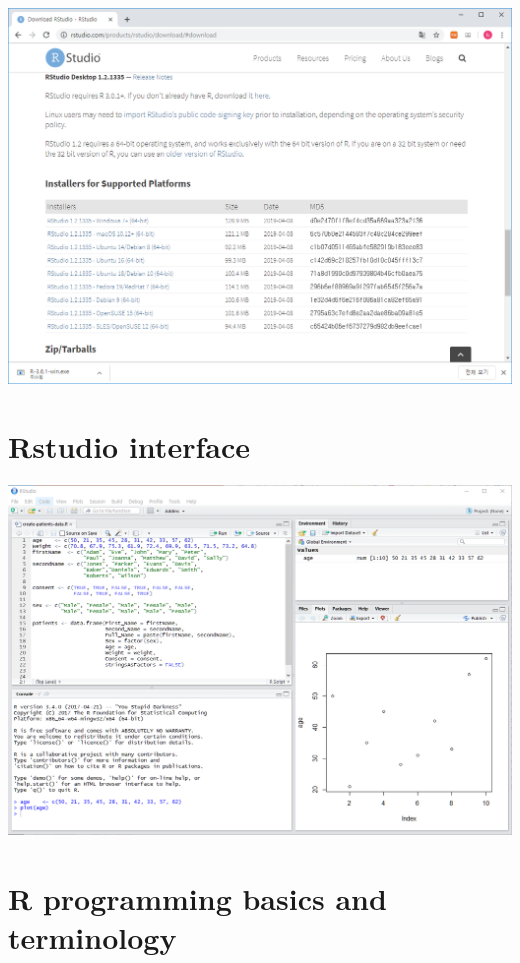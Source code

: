 \documentclass[]{book}
\begin{document}
\begin{itemize}
  \includegraphics{images/01-10.PNG}
\end{itemize}

\hypertarget{rstudio-interface}{%
\section{Rstudio interface}\label{rstudio-interface}}

\includegraphics{images/01-11.PNG}

\hypertarget{r-programming-basics-and-terminology}{%
\section{R programming basics and terminology}\label{r-programming-basics-and-terminology}}
\end{document}
